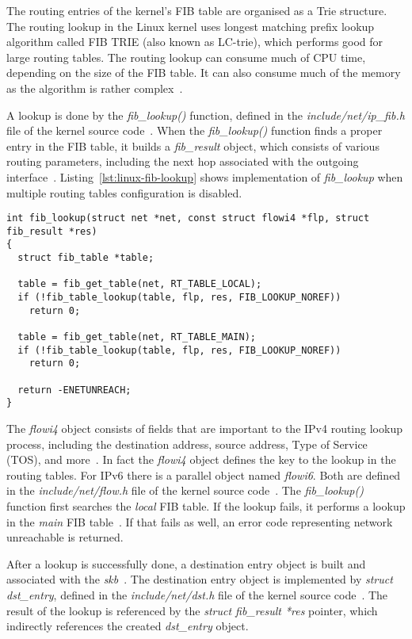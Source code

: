 The routing entries of the kernel's FIB table are organised as a Trie structure.
The routing lookup in the Linux kernel uses longest matching prefix lookup algorithm
called FIB TRIE (also known as LC-trie), which performs good for large routing tables.
The routing lookup can consume much of CPU time, depending on the size of the FIB table.
It can also consume much of the memory as the algorithm is rather complex~\cite{linux-kernel-networking}.

A lookup is done by the {\it{fib\_lookup()}} function, defined in the {\it{include/net/ip\_fib.h}} file
of the kernel source code~\cite{kernel-source}.
When the {\it{fib\_lookup()}} function finds a proper entry in the FIB table,
it builds a {\it{fib\_result}} object, which consists of various routing parameters,
including the next hop associated with the outgoing interface~\cite{linux-kernel-networking}.
Listing~\ref{lst:linux-fib-lookup} shows implementation of {\it{fib\_lookup}} when
multiple routing tables configuration is disabled.

\bigskip
\begin{lstlisting}[caption={Implementation of the fib\_lookup() function},label={lst:linux-fib-lookup}]
int fib_lookup(struct net *net, const struct flowi4 *flp, struct fib_result *res)
{
  struct fib_table *table;

  table = fib_get_table(net, RT_TABLE_LOCAL);
  if (!fib_table_lookup(table, flp, res, FIB_LOOKUP_NOREF))
    return 0;

  table = fib_get_table(net, RT_TABLE_MAIN);
  if (!fib_table_lookup(table, flp, res, FIB_LOOKUP_NOREF))
    return 0;

  return -ENETUNREACH;
}
\end{lstlisting}

The {\it{flowi4}} object consists of fields that are important to the IPv4 routing lookup process, including the
destination address, source address, Type of Service (TOS), and more~\cite{linux-kernel-networking}.
In fact the {\it{flowi4}} object defines the key to the lookup in the routing tables.
For IPv6 there is a parallel object named {\it{flowi6}}.
Both are defined in the {\it{include/net/flow.h}} file of the kernel source code~\cite{kernel-source}.
The {\it{fib\_lookup()}} function first searches the {\it{local}} FIB table.
If the lookup fails, it performs a lookup in the {\it{main}} FIB table~\cite{linux-kernel-networking}.
If that fails as well, an error code representing network unreachable is returned.

After a lookup is successfully done, a destination entry
object is built and associated with the {\it{skb}}~\cite{linux-kernel-networking}.
The destination entry object is implemented by {\it{struct dst\_entry}}, defined in the {\it{include/net/dst.h}} file of
the kernel source code~\cite{kernel-source}.
The result of the lookup is referenced by the {\it{struct fib\_result *res}} pointer,
which indirectly references the created {\it{dst\_entry}} object.


